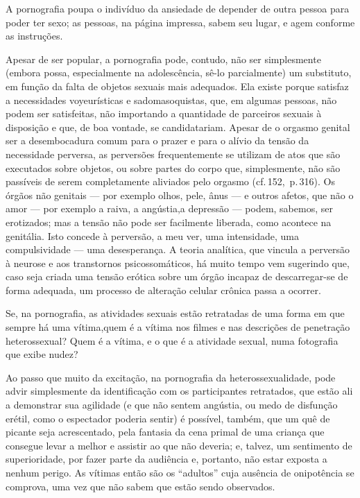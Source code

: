 A pornografia poupa o indivíduo da ansiedade de depender de outra
pessoa para poder ter sexo; as pessoas, na página impressa, sabem seu
lugar, e agem conforme as instruções.

Apesar de ser popular, a pornografia pode, contudo, não ser
simplesmente (embora possa, especialmente na adolescência, sê-lo
parcialmente) um substituto, em função da falta de objetos sexuais mais
adequados. Ela existe porque satisfaz a necessidades voyeurísticas e
sadomasoquistas, que, em algumas pessoas, não podem ser satisfeitas,
não importando a quantidade de parceiros sexuais à disposição e que, de
boa vontade, se candidatariam. Apesar de o orgasmo genital ser a
desembocadura comum para o prazer e para o alívio da tensão da
necessidade perversa, as perversões frequentemente se utilizam de atos
que são executados sobre objetos, ou sobre partes do corpo que,
simplesmente, não são passíveis de serem completamente aliviados pelo
orgasmo (cf.\,152,~p.\,316). Os órgãos não genitais\idxpervorgao{} --- por exemplo
olhos, pele, ânus --- e outros afetos, que não o amor --- por
exemplo a raiva, a angústia,\idxanguporn[|)] a depressão --- podem, sabemos, ser
erotizados; mas a tensão não pode ser facilmente liberada, como
acontece na genitália. Isto concede à perversão, a meu ver, uma
intensidade, uma compulsividade --- uma desesperança. A teoria
analítica, que vincula a perversão à neurose e aos transtornos
psicossomáticos,\idxpsicss{} há muito tempo vem sugerindo que, caso seja criada uma
tensão erótica sobre um órgão incapaz de descarregar-se de forma
adequada, um processo de alteração celular crônica passa a ocorrer.\idxpornoangu[|)]

Se, na pornografia, as atividades sexuais estão retratadas de uma
forma em que sempre há uma vítima,\idxpornoviti[|(] quem é a vítima nos filmes e nas
descrições de penetração heterossexual? Quem é a vítima, e o que é a
atividade sexual, numa fotografia que exibe nudez?


Ao passo que muito da excitação, na pornografia da
heterossexualidade, pode advir simplesmente da identificação com os
participantes retratados, que estão ali a demonstrar sua agilidade (e
que não sentem angústia, ou medo de disfunção erétil, como o espectador
poderia sentir) é possível, também, que um quê de picante seja
acrescentado, pela fantasia da cena primal de uma criança que consegue
levar a melhor e assistir ao que não deveria; e, talvez, um sentimento
de superioridade, por fazer parte da audiência e, portanto, não estar
exposta a nenhum perigo. As vítimas então são os
``adultos'' cuja ausência de onipotência se
comprova, uma vez que não sabem que estão sendo observados.

